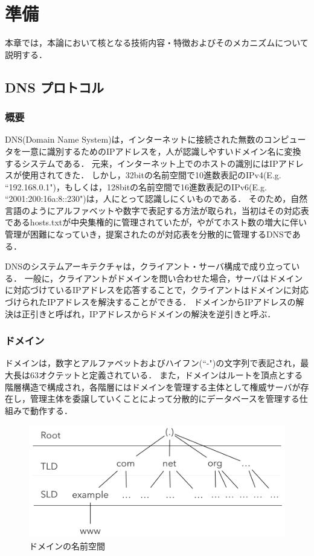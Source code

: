 \section{準備}
本章では，本論において核となる技術内容・特徴およびそのメカニズムについて説明する．
\subsection{DNS プロトコル}
\label{sec:dns-protocol}
\subsubsection{概要}
DNS(Domain Name System)は，インターネットに接続された無数のコンピュータを一意に識別するためのIPアドレスを，人が認識しやすいドメイン名に変換するシステムである．
元来，インターネット上でのホストの識別にはIPアドレスが使用されてきた．
しかし，32bitの名前空間で10進数表記のIPv4(E.g. ``192.168.0.1")，もしくは，128bitの名前空間で16進数表記のIPv6(E.g. ``2001:200:16a:8::230")は，人にとって認識しにくいものである．
そのため，自然言語のようにアルファベットや数字で表記する方法が取られ，当初はその対応表であるhosts.txtが中央集権的に管理されていたが，やがてホスト数の増大に伴い管理が困難になっていき，提案されたのが対応表を分散的に管理するDNSである．

DNSのシステムアーキテクチャは，クライアント・サーバ構成で成り立っている．
一般に，クライアントがドメインを問い合わせた場合，サーバはドメインに対応づけているIPアドレスを応答することで，クライアントはドメインに対応づけられたIPアドレスを解決することができる．
ドメインからIPアドレスの解決は正引きと呼ばれ，IPアドレスからドメインの解決を逆引きと呼ぶ．

\subsubsection{ドメイン}
ドメインは，数字とアルファベットおよびハイフン(``-")の文字列で表記され，最大長は63オクテットと定義されている．
また，ドメインはルートを頂点とする階層構造で構成され，各階層にはドメインを管理する主体として権威サーバが存在し，管理主体を委譲していくことによって分散的にデータベースを管理する仕組みで動作する．

\begin{figure}[h]
 \centering
 \includegraphics[width=12.0cm]{figure/dns-architecture.png}
 \caption{ドメインの名前空間}
 \label{fig:dns-architecture}
\end{figure}

